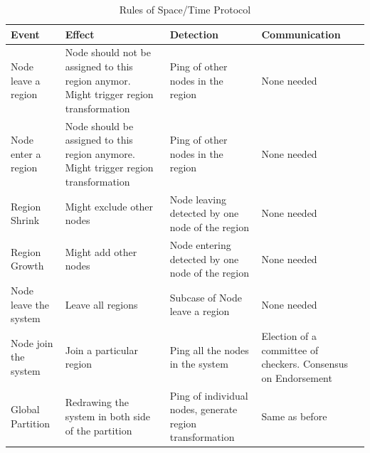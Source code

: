 \documentclass[a4paper,11pt,oneside]{report}
\begin{document}
\begin{table}
\centering
\begin{tabular}{m{}m{}*{2}{>{\arraybackslash}m{}}}
\toprule
Event                 & Effect                                                                                 & Detection                                                & Communication                                                 \\ \midrule
Node leave a region   & Node should not be assigned to this region anymor. Might trigger region transformation & Ping of other nodes in the region                        & None needed                                                   \\ \hdashline[0.5pt/5pt]
Node enter a region   & Node should be assigned to this region anymore. Might trigger region transformation    & Ping of other nodes in the region                        & None needed                                                   \\ \hdashline[0.5pt/5pt]
Region Shrink         & Might exclude other nodes                                                              & Node leaving detected by one node of the region          & None needed             \\ \hdashline[0.5pt/5pt]
Region Growth         & Might add other nodes                                                                  & Node entering detected by one node of the region         & None needed            \\ \hdashline[0.5pt/5pt]
Node leave the system & Leave all regions                                                                      & Subcase of Node leave a region                           & None needed                                                   \\ \hdashline[0.5pt/5pt]
Node join the system  & Join a particular region                                                               & Ping all the nodes in the system                         & Election of a committee of checkers. Consensus on Endorsement \\ \hdashline[0.5pt/5pt]
Global Partition      & Redrawing the system in both side of the partition                                     & Ping of individual nodes, generate region transformation & Same as before                                                \\ \bottomrule
\end{tabular}
\caption{Rules of Space/Time Protocol}
\label{tab:rules-space-graphs}
\end{table}
\end{document}
